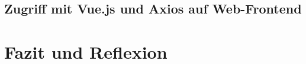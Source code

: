 \documentclass[12pt,oneside,titlepage,listof=totoc,bibliography=totoc]{scrartcl}
\begin{document}
\subsection{Zugriff mit Vue.js und Axios auf Web-Frontend}

\section{Fazit und Reﬂexion}









\newpage

\end{document}
